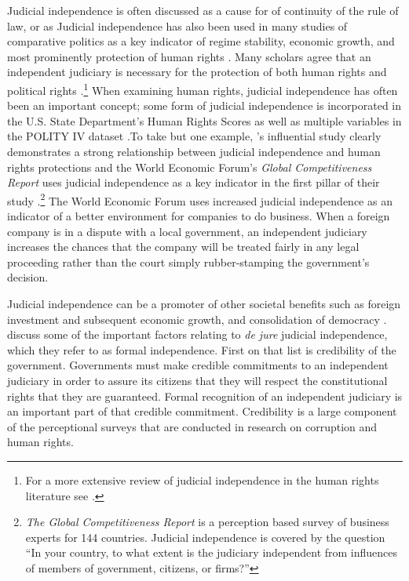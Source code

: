 \documentclass[Johnson MA Draft 2.tex]{subfiles}
\begin{document}
Judicial independence is often discussed as a cause for of continuity of the rule of law, or as   Judicial independence has also been used in many studies of comparative politics as a key indicator of regime stability, economic growth, and most prominently protection of human rights \citep[1]{Linzer2014}.  Many scholars agree that an independent judiciary is necessary for the protection of both human rights and political rights \citep{Keith2002a,Keith2002b,Howard2004,Russell2001}.\footnote{For a more extensive review of judicial independence in the human rights literature see \citep[Footnote 1]{Keith2002b}.}  When examining human rights, judicial independence has often been an important concept; some form of judicial independence is incorporated in the U.S. State Department's Human Rights Scores as well as multiple variables in the POLITY IV dataset \citep{Cingranelli2008, Polity,Howard2004}.To take but one example, \citet{Keith2002b}'s influential study clearly demonstrates a strong relationship between judicial independence and human rights protections and the World Economic Forum's \textit{Global Competitiveness Report} uses judicial independence as a key indicator in the first pillar of their study \citep{WEFGLR2014}.\footnote{\textit{The Global Competitiveness Report} is a perception based survey of business experts for 144 countries.  Judicial independence is covered by the question ``In your country, to what extent is the judiciary independent from influences of members of government, citizens, or firms?''}  The World Economic Forum uses increased judicial independence as an indicator of a better environment for companies to do business.  When a foreign company is in a dispute with a local government, an independent judiciary increases the chances that the company will be treated fairly in any legal proceeding rather than the court simply rubber-stamping the government's decision.  

Judicial independence can be a promoter of other societal benefits such as foreign investment and subsequent economic growth, and consolidation of democracy \citep[9]{Rios2006}.  \citet{Hayo2007} discuss some of the important factors relating to \textit{de jure} judicial independence, which they refer to as formal independence.  First on that list is credibility of the government.  Governments must make credible commitments to an independent judiciary in order to assure its citizens that they will respect the constitutional rights that they are guaranteed.  Formal recognition of an independent judiciary is an important part of that credible commitment.   Credibility is a large component of the perceptional surveys that are conducted in research on corruption and human rights.
\end{document}
